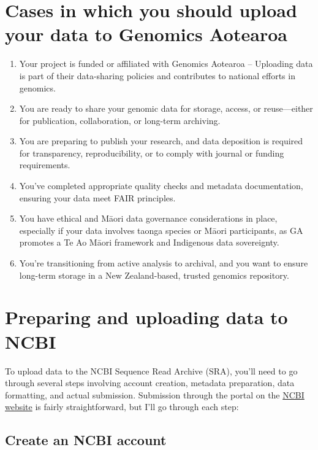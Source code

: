 \documentclass[
]{article}
\begin{document}
\hypertarget{cases-in-which-you-should-upload-your-data-to-genomics-aotearoa}{%
\section{Cases in which you should upload your data to Genomics
Aotearoa}\label{cases-in-which-you-should-upload-your-data-to-genomics-aotearoa}}

\begin{enumerate}
\def\labelenumi{\arabic{enumi}.}
\item
  Your project is funded or affiliated with Genomics Aotearoa --
  Uploading data is part of their data-sharing policies and contributes
  to national efforts in genomics.
\item
  You are ready to share your genomic data for storage, access, or
  reuse---either for publication, collaboration, or long-term archiving.
\item
  You are preparing to publish your research, and data deposition is
  required for transparency, reproducibility, or to comply with journal
  or funding requirements.
\item
  You've completed appropriate quality checks and metadata
  documentation, ensuring your data meet FAIR principles.
\item
  You have ethical and Māori data governance considerations in place,
  especially if your data involves taonga species or Māori participants,
  as GA promotes a Te Ao Māori framework and Indigenous data
  sovereignty.
\item
  You're transitioning from active analysis to archival, and you want to
  ensure long-term storage in a New Zealand-based, trusted genomics
  repository.
\end{enumerate}

\hypertarget{preparing-and-uploading-data-to-ncbi}{%
\section{Preparing and uploading data to
NCBI}\label{preparing-and-uploading-data-to-ncbi}}

To upload data to the NCBI Sequence Read Archive (SRA), you'll need to
go through several steps involving account creation, metadata
preparation, data formatting, and actual submission. Submission through
the portal on the \href{https://www.ncbi.nlm.nih.gov/}{NCBI website} is
fairly straightforward, but I'll go through each step:

\hypertarget{create-an-ncbi-account}{%
\subsection{Create an NCBI account}\label{create-an-ncbi-account}}
\end{document}
